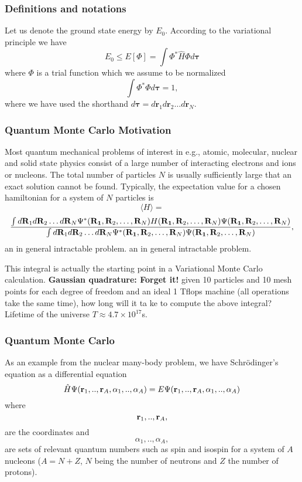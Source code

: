 \documentclass[compress]{beamer}
\begin{document}
\frame
{
  \frametitle{Definitions and notations}
\begin{small}
{\scriptsize
Let us denote the ground state energy by $E_0$. According to the
variational principle we have
\begin{equation*}
  E_0 \le E[\Phi] = \int \Phi^*\hat{H}\Phi d\mathbf{\tau}
\end{equation*}
where $\Phi$ is a trial function which we assume to be normalized
\begin{equation*}
  \int \Phi^*\Phi d\mathbf{\tau} = 1,
\end{equation*}
where we have used the shorthand $d\mathbf{\tau}=d\mathbf{r}_1d\mathbf{r}_2\dots d\mathbf{r}_N$.
}
\end{small}
}



\frame
{
  \frametitle{Quantum Monte Carlo Motivation}
\begin{small}
{\scriptsize
Most quantum mechanical  
problems of interest in e.g., atomic, molecular, nuclear and solid state 
physics consist of a large number of 
interacting electrons and ions or nucleons. 
The total number of particles $N$ is usually sufficiently large
that an exact solution cannot be found. 
Typically, 
the expectation value for a chosen hamiltonian for a system of 
$N$ particles is
\[
   \langle H \rangle =
\]
\[
   \frac{\int d{\bf R}_1d{\bf R}_2\dots d{\bf R}_N
         \Psi^{\ast}({\bf R_1},{\bf R}_2,\dots,{\bf R}_N)
          H({\bf R_1},{\bf R}_2,\dots,{\bf R}_N)
          \Psi({\bf R_1},{\bf R}_2,\dots,{\bf R}_N)}
        {\int d{\bf R}_1d{\bf R}_2\dots d{\bf R}_N
        \Psi^{\ast}({\bf R_1},{\bf R}_2,\dots,{\bf R}_N)
        \Psi({\bf R_1},{\bf R}_2,\dots,{\bf R}_N)},
\]
an in general intractable problem.
an in general intractable problem.

 This integral is actually the starting point in a Variational Monte Carlo calculation.\newline
 {\bf Gaussian quadrature: Forget it!} given 10 particles and 10 mesh points for each degree of freedom
and an
 ideal 1 Tflops machine (all operations take the same time), how long will it ta
ke to compute the above integral? Lifetime of the universe $T\approx 4.7 \times
10^{17}$s.
}
\end{small}
}


\frame
{
  \frametitle{Quantum Monte Carlo}
\begin{small}
{\scriptsize
As an example from the nuclear many-body problem, we have Schr\"odinger's
equation as 
a differential equation
\[
  \hat{H}\Psi({\bf r}_1,..,{\bf r}_A,\alpha_1,..,\alpha_A)=E\Psi({\bf r}_1,..,{\bf r}_A,\alpha_1,..,\alpha_A)
\]
where
\[
  {\bf r}_1,..,{\bf r}_A,
\]
are the coordinates and 
\[
  \alpha_1,..,\alpha_A,
\]
are sets of relevant quantum numbers such as spin and isospin for a system of 
$A$ nucleons ($A=N+Z$, $N$ being the number of neutrons and $Z$ the number of protons).
}
\end{small}
}
\end{document}
